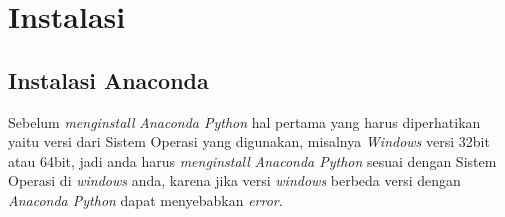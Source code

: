 \section{Instalasi}
\subsection{Instalasi Anaconda}
\par
	Sebelum \textit{menginstall} \textit{Anaconda Python} hal pertama yang harus diperhatikan yaitu versi dari Sistem Operasi yang digunakan, misalnya \textit{Windows} versi 32bit atau 64bit, jadi anda harus \textit{menginstall} \textit{Anaconda Python} sesuai dengan Sistem Operasi di \textit{windows} anda, karena jika versi \textit{windows} berbeda versi dengan \textit{Anaconda Python} dapat menyebabkan \textit{error}.\\


